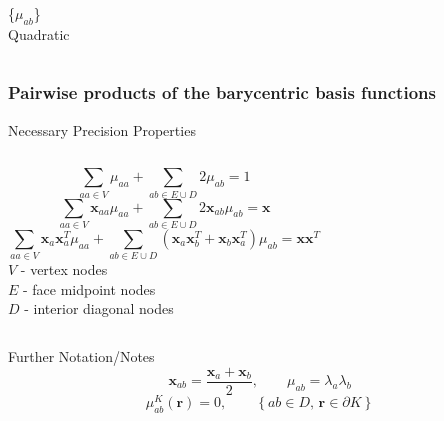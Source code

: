 \documentclass[compress,10pt]{beamer}
\renewcommand{\vec}[1]{\mathbf{#1}}
\begin{document}
\begin{frame}[t]
\begin{columns}[c]
{\{$\mu_{ab}$\} \\
Quadratic
}
\centering
{}
\end{columns}
\end{frame}
\begin{frame}[t]\frametitle{Pairwise products of the barycentric basis functions}
\begin{block}{Necessary Precision Properties}
\begin{columns}
\begin{equation*}
\sum_{aa \in V} \mu_{aa} + \sum_{ab \in E \cup D} 2 \mu_{ab} = 1
\end{equation*}
\begin{equation*}
\sum_{aa \in V} \vec{x}_{aa} \mu_{aa} + \sum_{ab \in E \cup D} 2 \vec{x}_{ab} \mu_{ab} = \vec{x}
\end{equation*}
\begin{equation*}
\sum_{aa \in V} \vec{x}_{a} \vec{x}_{a}^T \mu_{aa} + \sum_{ab \in E \cup D} \left(  \vec{x}_{a} \vec{x}_{b}^T + \vec{x}_{b} \vec{x}_{a}^T  \right) \mu_{ab} = \vec{x} \vec{x}^{T}
\end{equation*}
{\small
$V$ - vertex nodes \\
$E$ - face midpoint nodes \\
$D$ - interior diagonal nodes
}
\end{columns}
\end{block}
\begin{block}{Further Notation/Notes}
\begin{equation*}
\vec{x}_{ab} = \frac{\vec{x}_{a} + \vec{x}_{b}}{2}, \qquad \mu_{ab} = \lambda_a \lambda_b
\end{equation*}
\vspace{0.4cm}
\begin{equation*}
\mu^{K}_{ab}(\vec{r}) = 0, \qquad \left\{ ab \in D , \, \vec{r} \in \partial K  \right\}
\end{equation*}
\end{block}
\end{frame}
\end{document}
